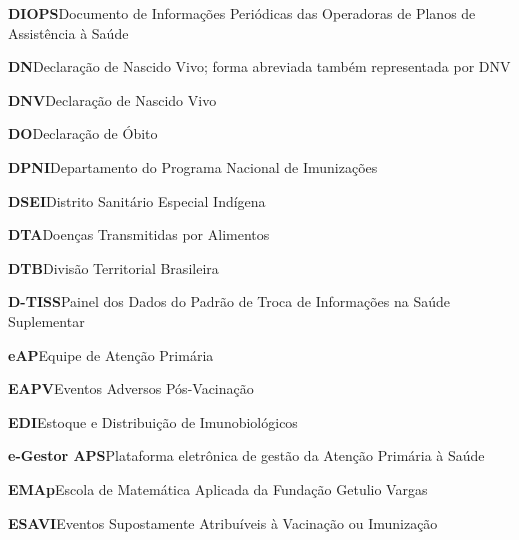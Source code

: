 \noindent\textbf{DIOPS}\hspace{1em}Documento de Informações Periódicas das Operadoras de Planos de Assistência à Saúde\par\smallskip
\noindent\textbf{DN}\hspace{1em}Declaração de Nascido Vivo; forma abreviada também representada por DNV\par\smallskip
\noindent\textbf{DNV}\hspace{1em}Declaração de Nascido Vivo\par\smallskip
\noindent\textbf{DO}\hspace{1em}Declaração de Óbito\par\smallskip
\noindent\textbf{DPNI}\hspace{1em}Departamento do Programa Nacional de Imunizações\par\smallskip
\noindent\textbf{DSEI}\hspace{1em}Distrito Sanitário Especial Indígena\par\smallskip
\noindent\textbf{DTA}\hspace{1em}Doenças Transmitidas por Alimentos\par\smallskip
\noindent\textbf{DTB}\hspace{1em}Divisão Territorial Brasileira\par\smallskip
\noindent\textbf{D-TISS}\hspace{1em}Painel dos Dados do Padrão de Troca de Informações na Saúde Suplementar\par\smallskip
\noindent\textbf{eAP}\hspace{1em}Equipe de Atenção Primária\par\smallskip
\noindent\textbf{EAPV}\hspace{1em}Eventos Adversos Pós-Vacinação\par\smallskip
\noindent\textbf{EDI}\hspace{1em}Estoque e Distribuição de Imunobiológicos\par\smallskip
\noindent\textbf{e-Gestor APS}\hspace{1em}Plataforma eletrônica de gestão da Atenção Primária à Saúde\par\smallskip
\noindent\textbf{EMAp}\hspace{1em}Escola de Matemática Aplicada da Fundação Getulio Vargas\par\smallskip
\noindent\textbf{ESAVI}\hspace{1em}Eventos Supostamente Atribuíveis à Vacinação ou Imunização\par\smallskip
